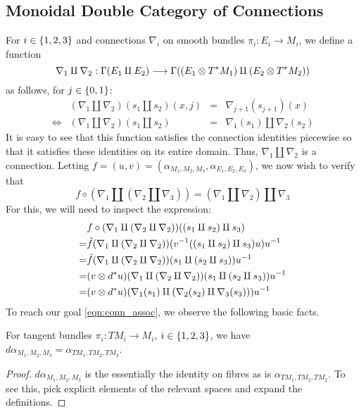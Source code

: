 
\subsection{Monoidal Double Category of Connections}

For $i \in \set{1, 2, 3}$ and connections $\nabla_i$ on smooth bundles
$\pi_i : E_i \to M_i$, we define a function
\[
  \nabla_1 \amalg \nabla_2
    : \Gamma(E_1 \amalg E_2)
    \stackrel{}{\longrightarrow} \Gamma((E_1 \otimes T^*M_1) \amalg (E_2 \otimes T^*M_2))
\]
as follows, for $j \in \set{0, 1}$:
\[\begin{array}{crcl}
       & (\nabla_1 \amalg \nabla_2)(s_1 \amalg s_2)(x, j)
       & = & \nabla_{j + 1}(s_{j + 1})(x) \\
  \iff & (\nabla_1 \amalg \nabla_2)(s_1 \amalg s_2)
       & = & \nabla_1(s_1) \amalg \nabla_2(s_2)
\end{array}\]
It is easy to see that this function satisfies the connection identities
piecewise so that it satisfies these identities on its entire domain. Thus,
$\nabla_1 \amalg \nabla_2$ is a connection. Letting
$f = (u, v) = (\alpha_{M_1, M_2, M_3}, \alpha_{E_1, E_2, E_3})$, we now wish to
verify that
\begin{equation}\label{eqn:conn_assoc}
  f \diamond (\nabla_1 \amalg (\nabla_2 \amalg \nabla_3))
    = (\nabla_1 \amalg \nabla_2) \amalg \nabla_3
\end{equation}
For this, we will need to inspect the expression:
\begin{align*}
   & f \diamond (\nabla_1 \amalg (\nabla_2 \amalg \nabla_2))(
        (s_1 \amalg s_2) \amalg s_3
     ) \\
  =& \tilde{f}(\nabla_1 \amalg (\nabla_2 \amalg \nabla_2))(
      v^{-1}((s_1 \amalg s_2) \amalg s_3)u
     )u^{-1} \\
  =& \tilde{f}(\nabla_1 \amalg (\nabla_2 \amalg \nabla_2))(
      s_1 \amalg (s_2 \amalg s_3)
     )u^{-1} \\
  =& (v \otimes d^*u)(\nabla_1 \amalg (\nabla_2 \amalg \nabla_2))(
      s_1 \amalg (s_2 \amalg s_3)
     )u^{-1} \\
  =& (v \otimes d^*u)(
      \nabla_1(s_1) \amalg (\nabla_2(s_2) \amalg \nabla_3(s_3))
     )u^{-1}
\end{align*}
To reach our goal \eqref{eqn:conn_assoc}, we observe the following basic facts.
\begin{cor}
For tangent bundles $\pi_i : TM_i \to M_i$, $i \in \set{1, 2, 3}$, we have
$d\alpha_{M_1, M_2, M_3} = \alpha_{TM_1, TM_2, TM_3}$.
\end{cor}
\begin{proof}
$d\alpha_{M_1, M_2, M_3}$ is the essentially the identity on fibres as is
$\alpha_{TM_1, TM_2, TM_2}$. To see this, pick explicit elements of
the relevant spaces and expand the definitions.
\end{proof}

